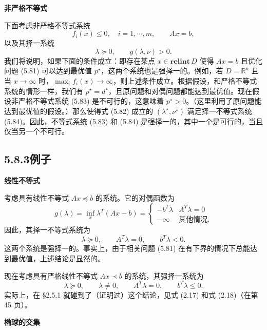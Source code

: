 \documentclass[UTF8, 12pt, fontset=fandol, oneside]{ctexart}
\begin{document}
\noindent\textbf{非严格不等式}

下面考虑非严格不等式系统
\begin{equation}
f_i(x)\leq 0,\quad i=1,\cdots,m,\qquad Ax=b,
\tag{5.83}
\end{equation}
以及其择一系统
\begin{equation}
\lambda\succeq 0,\qquad g(\lambda,\nu)>0.
\tag{5.84}
\end{equation}
我们将说明，如果下面的条件成立：即存在某点 $x\in\mathbf{relint}\,D$ 使得 $Ax=b$ 且优化问题 (5.81) 可以达到最优值 $p^\star$，这两个系统也是强择一的。例如，若 $D=\mathbb{R}^n$ 且当 $x\to\infty$ 时，$\max_i f_i(x)\to\infty$，则上述条件成立。根据假设，和严格不等式系统的情形一样，我们有 $p^\star=d^\star$，且原问题和对偶问题都能达到最优值。现在假设非严格不等式系统 (5.83) 是不可行的，这意味着 $p^\star>0$。（这里利用了原问题能达到最优值的假设。）那么使得式 (5.82) 成立的 $(\lambda^\star,\nu^\star)$ 满足择一不等式系统 (5.84)。因此，不等式系统 (5.83) 和 (5.84) 是强择一的，其中一个是可行的，当且仅当另一个不可行。

\subsection*{5.8.3\quad 例子}

\noindent\textbf{线性不等式}

考虑具有线性不等式 $Ax\preceq b$ 的系统。它的对偶函数为
\[
g(\lambda)=\inf_x \lambda^T(Ax-b)=
\begin{cases}
-b^T\lambda & A^T\lambda=0\\
-\infty & \text{其他情况}.
\end{cases}
\]
因此，其择一不等式系统为
\[
\lambda\succeq 0,\qquad A^T\lambda=0,\qquad b^T\lambda<0.
\]
这两个系统是强择一的。事实上，由于相关问题 (5.81) 在有下界的情况下总能达到最优值，上述结论是显然的。

现在考虑具有严格线性不等式 $Ax\prec b$ 的系统，其强择一系统为
\[
\lambda\succeq 0,\qquad \lambda\neq 0,\qquad A^T\lambda=0,\qquad b^T\lambda\leq 0.
\]
实际上，在 §2.5.1 就碰到了（证明过）这个结论，见式 (2.17) 和式 (2.18)（在第 45 页）。

\noindent\textbf{椭球的交集}
\end{document}
